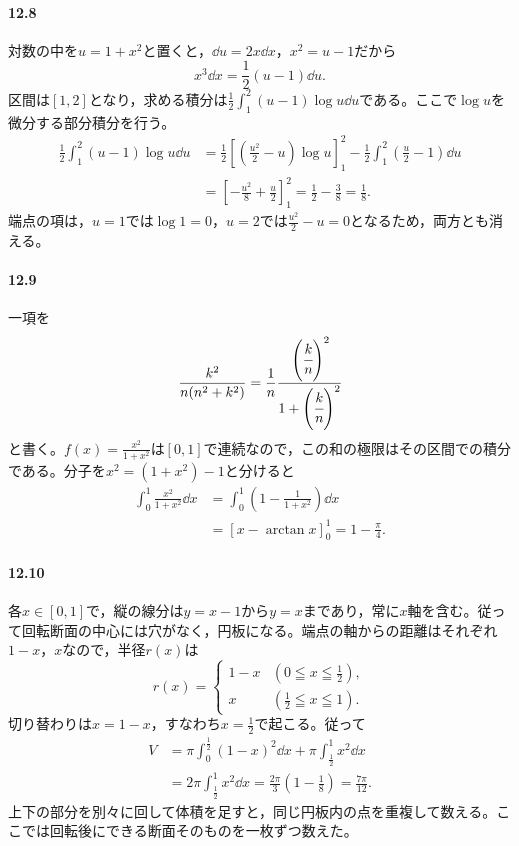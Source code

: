 \paragraph{12.8}
対数の中を$u=1+x^2$と置くと，$\dd u=2x\dd x$，$x^2=u-1$だから
\[
 x^3\dd x=\frac12(u-1)\dd u.
\]
区間は$[1,2]$となり，求める積分は$\frac12\int_1^2(u-1)\log u\dd u$である。ここで$\log u$を微分する部分積分を行う。
\[
 \begin{aligned}
 \frac12\int_1^2(u-1)\log u\dd u
 &=\frac12\left[\left(\frac{u^2}{2}-u\right)\log u\right]_1^2
   -\frac12\int_1^2\left(\frac u2-1\right)\dd u\\
 &=\left[-\frac{u^2}{8}+\frac u2\right]_1^2
 =\frac12-\frac38
 =\boxed{\frac18}.
 \end{aligned}
\]
端点の項は，$u=1$では$\log1=0$，$u=2$では$\frac{u^2}{2}-u=0$となるため，両方とも消える。

\paragraph{12.9}
一項を
\[
 \frac{k^2}{n(n^2+k^2)}
 =\frac1n\cfrac{\left(\cfrac kn\right)^2}{1+\left(\cfrac kn\right)^2}
\]
と書く。$f(x)=\frac{x^2}{1+x^2}$は$[0,1]$で連続なので，この和の極限はその区間での積分である。分子を$x^2=(1+x^2)-1$と分けると
\[
 \begin{aligned}
 \int_0^1\frac{x^2}{1+x^2}\dd x
 &=\int_0^1\left(1-\frac1{1+x^2}\right)\dd x\\
 &=\left[x-\arctan x\right]_0^1
 =\boxed{1-\frac{\pi}{4}}.
 \end{aligned}
\]

\paragraph{12.10}
各$x\in[0,1]$で，縦の線分は$y=x-1$から$y=x$まであり，常に$x$軸を含む。従って回転断面の中心には穴がなく，円板になる。端点の軸からの距離はそれぞれ$1-x$，$x$なので，半径$r(x)$は
\[
 r(x)=
 \begin{cases}
  1-x&\left(0\leqq x\leqq\frac12\right),\\
  x&\left(\frac12\leqq x\leqq1\right).
 \end{cases}
\]
切り替わりは$x=1-x$，すなわち$x=\frac12$で起こる。従って
\[
 \begin{aligned}
 V&=\pi\int_0^{\frac12}(1-x)^2\dd x
   +\pi\int_{\frac12}^{1}x^2\dd x\\
 &=2\pi\int_{\frac12}^{1}x^2\dd x
 =\frac{2\pi}{3}\left(1-\frac18\right)
 =\boxed{\frac{7\pi}{12}}.
 \end{aligned}
\]
上下の部分を別々に回して体積を足すと，同じ円板内の点を重複して数える。ここでは回転後にできる断面そのものを一枚ずつ数えた。

